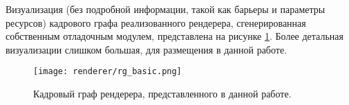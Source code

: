Визуализация (без подробной информации, такой как барьеры и параметры ресурсов) кадрового графа реализованного рендерера, сгенерированная собственным отладочным модулем, представлена на рисунке \ref{fig:res_rg_basic}. Более детальная визуализации слишком большая, для размещения в данной работе.

\begin{figure}[h]
    \centering
    \texttt{[image: renderer/rg\_basic.png]}
    \caption{Кадровый граф рендерера, представленного в данной работе.}
    \label{fig:res_rg_basic}
\end{figure}